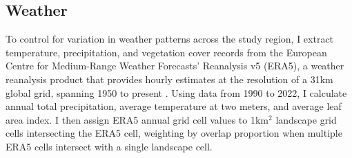 \subsection{Weather}

To control for variation in weather patterns across the study region, I extract temperature, precipitation, and vegetation cover records from the European Centre for Medium-Range Weather Forecasts' Reanalysis v5 (ERA5), a weather reanalysis product that provides hourly estimates at the resolution of a 31km global grid, spanning 1950 to present \citep{hersbach_era5_2020}. Using data from 1990 to 2022, I calculate annual total precipitation, average temperature at two meters, and average leaf area index. I then assign ERA5 annual grid cell values to 1km$^2$ landscape grid cells intersecting the ERA5 cell, weighting by overlap proportion when multiple ERA5 cells intersect with a single landscape cell.

